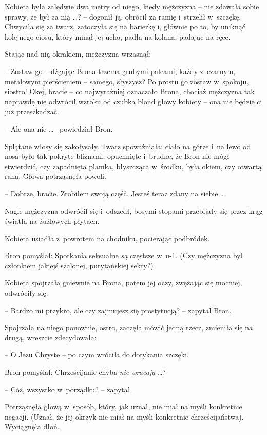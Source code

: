 \documentclass[oneside,polish,11pt,rmheadings]{mwbk}
\begin{document}
Kobieta była zaledwie dwa metry od niego, kiedy mężczyzna -- nie zdawała sobie sprawy, że był za nią \ldots ? -- dogonił ją, obrócił za ramię i~strzelił w~szczękę. Chwyciła się za twarz, zatoczyła się na barierkę i, głównie po to, by uniknąć kolejnego ciosu, który minął jej ucho, padła na kolana, padając na ręce. 

 Stając nad nią okrakiem, mężczyzna wrzasnął: 

-- Zostaw go -- dźgając Brona trzema grubymi palcami, każdy z~czarnym, metalowym pierścieniem -- samego, słyszysz? Po prostu go zostaw w~spokoju, siostro! Okej, bracie -- co najwyraźniej oznaczało Brona, chociaż mężczyzna tak naprawdę nie odwrócił wzroku od czubka blond głowy kobiety -- ona nie będzie ci już przeszkadzać. 

-- Ale ona nie  \ldots  -- powiedział Bron. 

Splątane włosy się zakołysały. Twarz spoważniała: ciało na górze i~na lewo od nosa było tak pokryte bliznami, opuchnięte i~brudne, że Bron nie mógł stwierdzić, czy zapadnięta plamka, błyszcząca w~środku, była okiem, czy otwartą raną. Głowa potrząsnęła powoli. 

-- Dobrze, bracie.  Zrobiłem swoją część. Jesteś teraz zdany na siebie \ldots  

Nagle mężczyzna odwrócił się i~odszedł, bosymi stopami przebijały się przez krąg światła na żużlowych płytach. 

Kobieta usiadła z~powrotem na chodniku, pocierając podbródek. 

Bron pomyślał: Spotkania seksualne \textit{są} częstsze w~u-1.  (Czy mężczyzna był członkiem jakiejś szalonej, purytańskiej sekty?) 

Kobieta spojrzała gniewnie na Brona, potem jej oczy, zwężając się mocniej, odwróciły się. 

-- Bardzo mi przykro, ale czy zajmujesz się prostytucją? -- zapytał Bron. 

Spojrzała na niego ponownie, ostro, zaczęła mówić jedną rzecz, zmieniła się na drugą, wreszcie zdecydowała: 

-- O Jezu Chryste -- po czym wróciła do dotykania szczęki. 

Bron pomyślał: Chrześcijanie chyba \textit{nie wracają } \ldots ?  

-- Cóż, wszystko w~porządku? -- zapytał. 

Potrząsnęła głową w~sposób, który, jak uznał, nie miał na myśli konkretnie negacji. (Uznał, że jej okrzyk nie miał na myśli konkretnie chrześcijaństwa). Wyciągnęła dłoń.  
\end{document}
